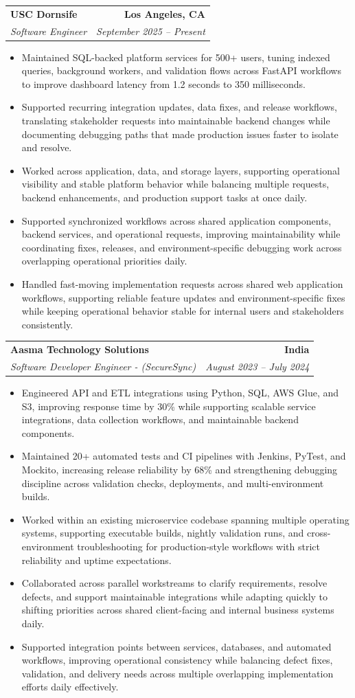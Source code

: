 \documentclass[letterpaper,10pt]{article}
\makeatletter
\newcommand{\resumeItem}[1]{\item\small{{#1 \vspace{-2pt}}}}
\newcommand{\resumeSubheading}[4]{\vspace{-1pt}\item\begin{tabular*}{1.0\textwidth}[t]{l@{\extracolsep{\fill}}r}\textbf{#1} & \textbf{\small #2} \\\textit{\small#3} & \textit{\small #4} \\\end{tabular*}\vspace{-2pt}}
\newcommand{\resumeItemListStart}{\begin{itemize}[leftmargin=0.15in,label=\textbullet,itemsep=2pt,topsep=0pt,parsep=0pt,partopsep=0pt]}
\newcommand{\resumeItemListEnd}{\end{itemize}\vspace{-4pt}}
\makeatother
\begin{document}
\resumeSubheading{USC Dornsife}{Los Angeles, CA}{Software Engineer}{September 2025 -- Present}
\resumeItemListStart
\resumeItem{Maintained SQL-backed platform services for 500+ users, tuning indexed queries, background workers, and validation flows across FastAPI workflows to improve dashboard latency from 1.2 seconds to 350 milliseconds.}
\resumeItem{Supported recurring integration updates, data fixes, and release workflows, translating stakeholder requests into maintainable backend changes while documenting debugging paths that made production issues faster to isolate and resolve.}
\resumeItem{Worked across application, data, and storage layers, supporting operational visibility and stable platform behavior while balancing multiple requests, backend enhancements, and production support tasks at once daily.}
\resumeItem{Supported synchronized workflows across shared application components, backend services, and operational requests, improving maintainability while coordinating fixes, releases, and environment-specific debugging work across overlapping operational priorities daily.}
\resumeItem{Handled fast-moving implementation requests across shared web application workflows, supporting reliable feature updates and environment-specific fixes while keeping operational behavior stable for internal users and stakeholders consistently.}
\resumeItemListEnd

\resumeSubheading{Aasma Technology Solutions}{India}{Software Developer Engineer - (SecureSync)}{August 2023 -- July 2024}
\resumeItemListStart
\resumeItem{Engineered API and ETL integrations using Python, SQL, AWS Glue, and S3, improving response time by 30\% while supporting scalable service integrations, data collection workflows, and maintainable backend components.}
\resumeItem{Maintained 20+ automated tests and CI pipelines with Jenkins, PyTest, and Mockito, increasing release reliability by 68\% and strengthening debugging discipline across validation checks, deployments, and multi-environment builds.}
\resumeItem{Worked within an existing microservice codebase spanning multiple operating systems, supporting executable builds, nightly validation runs, and cross-environment troubleshooting for production-style workflows with strict reliability and uptime expectations.}
\resumeItem{Collaborated across parallel workstreams to clarify requirements, resolve defects, and support maintainable integrations while adapting quickly to shifting priorities across shared client-facing and internal business systems daily.}
\resumeItem{Supported integration points between services, databases, and automated workflows, improving operational consistency while balancing defect fixes, validation, and delivery needs across multiple overlapping implementation efforts daily effectively.}
\resumeItemListEnd
\end{document}
